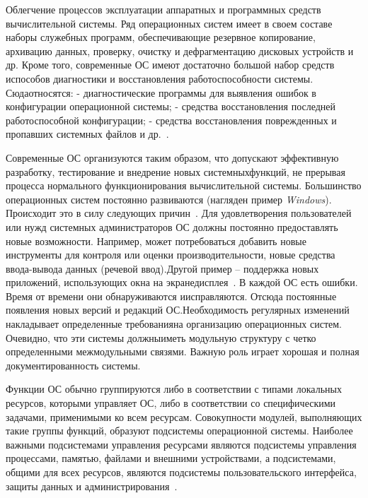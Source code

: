 Облегчение процессов эксплуатации аппаратных и программных средств вычислительной системы. Ряд операционных систем имеет в своем составе наборы   служебных   программ,   обеспечивающие   резервное   копирование, архивацию данных, проверку, очистку и дефрагментацию дисковых устройств и др. Кроме того, современные ОС имеют достаточно большой набор средств испособов диагностики и восстановления работоспособности системы. Сюдаотносятся: - диагностические программы для выявления ошибок в конфигурации операционной системы; - средства восстановления последней работоспособной конфигурации; - средства   восстановления   поврежденных   и   пропавших   системных файлов и др.~\cite{Oc1}.

Современные   ОС   организуются   таким   образом,   что   допускают эффективную   разработку,   тестирование   и   внедрение   новых   системныхфункций,   не   прерывая   процесса   нормального   функционирования вычислительной   системы.   Большинство   операционных   систем   постоянно развиваются (нагляден пример \textit{Windows}). Происходит это в силу следующих причин~\cite{Oc1}. Для удовлетворения пользователей или нужд системных администраторов ОС должны постоянно предоставлять новые возможности. Например, может потребоваться   добавить   новые   инструменты   для   контроля   или   оценки производительности,   новые   средства   ввода-вывода   данных   (речевой   ввод).Другой пример – поддержка новых приложений, использующих окна на экранедисплея~\cite{Oc1}. В каждой ОС есть ошибки. Время от времени они обнаруживаются иисправляются. Отсюда постоянные появления новых версий и редакций ОС.Необходимость регулярных изменений накладывает определенные требованияна организацию операционных систем. Очевидно, что эти системы должныиметь модульную структуру с четко определенными межмодульными связями. Важную роль играет хорошая и полная документированность системы.~\cite{Oc1}

Функции   ОС   обычно   группируются   либо   в   соответствии   с   типами локальных   ресурсов,   которыми   управляет   ОС,   либо   в   соответствии   со специфическими задачами, применимыми ко всем ресурсам. Совокупности модулей,   выполняющих   такие   группы   функций,   образуют   подсистемы операционной   системы.   Наиболее   важными   подсистемами   управления ресурсами являются подсистемы управления процессами, памятью, файлами и внешними устройствами, а подсистемами, общими для всех ресурсов, являются подсистемы   пользовательского   интерфейса,   защиты   данных   и администрирования~\cite{Oc2}.

